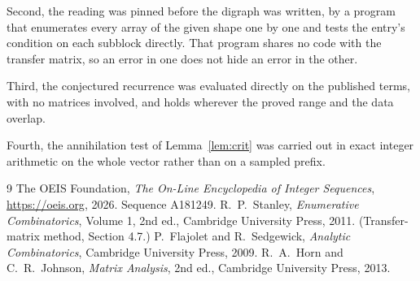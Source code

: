\documentclass[11pt,a4paper]{article}
\theoremstyle{plain}
\theoremstyle{definition}
\begin{document}
Second, the reading was pinned before the digraph was written, by a program that enumerates
every array of the given shape one by one and tests the entry's condition on each subblock
directly. That program shares no code with the transfer matrix, so an error in one does not
hide an error in the other.

Third, the conjectured recurrence was evaluated directly on the published terms, with no
matrices involved, and holds wherever the proved range and the data overlap.

Fourth, the annihilation test of Lemma~\ref{lem:crit} was carried out in exact integer
arithmetic on the whole vector rather than on a sampled prefix.

\begin{thebibliography}{9}
 The OEIS Foundation, \emph{The On-Line Encyclopedia of Integer
Sequences}, \url{https://oeis.org}, 2026. Sequence A181249.
 R.~P.~Stanley, \emph{Enumerative Combinatorics}, Volume 1, 2nd ed.,
Cambridge University Press, 2011. (Transfer-matrix method, Section 4.7.)
 P.~Flajolet and R.~Sedgewick, \emph{Analytic Combinatorics}, Cambridge
University Press, 2009.
 R.~A.~Horn and C.~R.~Johnson, \emph{Matrix Analysis}, 2nd ed., Cambridge
University Press, 2013.
\end{thebibliography}
\end{document}
